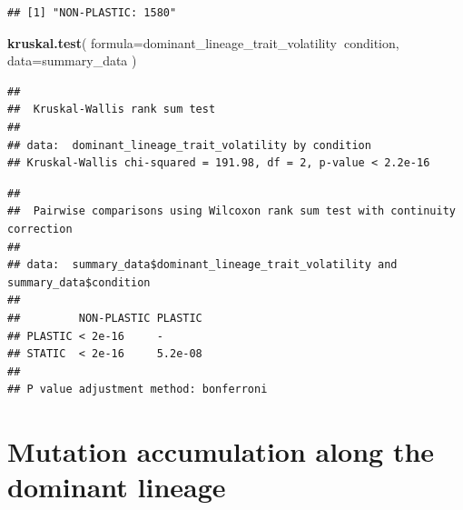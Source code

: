 \documentclass[]{book}
\newenvironment{Shaded}{\begin{snugshade}}{\end{snugshade}}
\newcommand{\DataTypeTok}[1]{\textcolor[rgb]{0.13,0.29,0.53}{#1}}
\newcommand{\KeywordTok}[1]{\textcolor[rgb]{0.13,0.29,0.53}{\textbf{#1}}}
\newcommand{\NormalTok}[1]{#1}
\newcommand{\OperatorTok}[1]{\textcolor[rgb]{0.81,0.36,0.00}{\textbf{#1}}}
\newcommand{\StringTok}[1]{\textcolor[rgb]{0.31,0.60,0.02}{#1}}
\begin{document}
\begin{verbatim}
## [1] "NON-PLASTIC: 1580"
\end{verbatim}

\begin{Shaded}
\begin{Highlighting}[]
\KeywordTok{kruskal.test}\NormalTok{(}
  \DataTypeTok{formula=}\NormalTok{dominant_lineage_trait_volatility}\OperatorTok{~}\NormalTok{condition,}
  \DataTypeTok{data=}\NormalTok{summary_data}
\NormalTok{)}
\end{Highlighting}
\end{Shaded}

\begin{verbatim}
## 
##  Kruskal-Wallis rank sum test
## 
## data:  dominant_lineage_trait_volatility by condition
## Kruskal-Wallis chi-squared = 191.98, df = 2, p-value < 2.2e-16
\end{verbatim}

\begin{Shaded}
\end{Shaded}

\begin{verbatim}
## 
##  Pairwise comparisons using Wilcoxon rank sum test with continuity correction 
## 
## data:  summary_data$dominant_lineage_trait_volatility and summary_data$condition 
## 
##         NON-PLASTIC PLASTIC
## PLASTIC < 2e-16     -      
## STATIC  < 2e-16     5.2e-08
## 
## P value adjustment method: bonferroni
\end{verbatim}

\hypertarget{mutation-accumulation-along-the-dominant-lineage}{%
\section{Mutation accumulation along the dominant lineage}\label{mutation-accumulation-along-the-dominant-lineage}}
\end{document}
